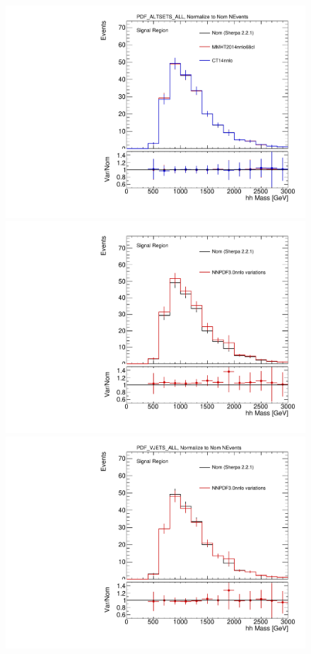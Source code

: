 \begin{figure}[!htbp]
\begin{center}
\includegraphics[scale=0.33]{./figures/boosted/systematics/wjets_alt_hhMass_SR_syst_PDF_ALTSETS_ALL}\\
\includegraphics[scale=0.33]{./figures/boosted/systematics/wjets_alt_hhMass_SR_syst_PDF_VJETS_ALL_UnNormalized} 
\includegraphics[scale=0.33]{./figures/boosted/systematics/wjets_alt_hhMass_SR_syst_PDF_VJETS_ALL}

\end{center}
\end{figure}
